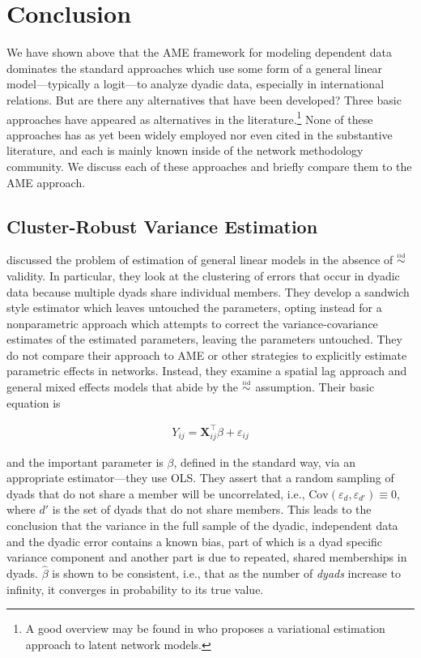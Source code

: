 \section{\textbf{Conclusion}}

We have shown above that the AME framework for modeling dependent data dominates the standard approaches which use some form of a general linear model---typically a logit---to analyze dyadic data, especially in international relations. But are there any alternatives that have been developed? Three basic approaches have appeared as alternatives in the literature.\footnote{A good overview may be found in \cite{stewart:2014} who proposes a variational estimation approach to latent network models.} None of these approaches has as yet been widely employed nor even cited in the substantive literature, and each is mainly known inside of the network methodology community.  We discuss each of these approaches and briefly compare them to the AME approach. 


\subsection*{Cluster-Robust Variance Estimation}

\cite{aronow:etal:2015} discussed the problem of estimation of general linear models in the absence of $\simiid$ validity. In particular, they look at the clustering of errors that occur in dyadic data because multiple dyads share individual members. They develop a sandwich style estimator which leaves untouched the parameters, opting instead for a nonparametric approach which attempts to correct the variance-covariance estimates of the estimated parameters, leaving the parameters untouched.  They do not compare their approach to AME or other strategies to explicitly estimate parametric effects in networks. Instead, they examine a spatial lag approach and general mixed effects models that abide by the $\simiid$ assumption.  Their basic equation is 

\begin{eqnarray*}
Y_{ij} = \mathbf{X}_{ij}^\intercal \beta + \varepsilon_{ij}
\end{eqnarray*}

and the important parameter is $\beta$, defined in the standard way, via an appropriate estimator---they use OLS.  They assert that a random sampling of dyads that do not share a member will be uncorrelated, i.e., $\text{Cov}(\varepsilon_d,\varepsilon_{d'}) \equiv 0$, where $d'$ is the set of dyads that do not share members. This leads to the conclusion that the variance in the full sample of the dyadic, independent data and the dyadic error contains a known bias, part of which is a dyad specific variance component and another part is due to repeated, shared memberships in dyads. $\hat{\beta}$ is shown to be consistent, i.e., that as the number of \emph{dyads} increase to infinity, it converges in probability to its true value. 

